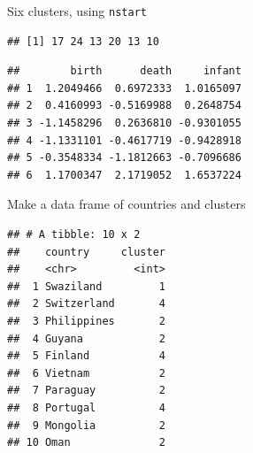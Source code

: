 \documentclass[ignorenonframetext,]{beamer}
\newenvironment{Shaded}{\begin{snugshade}}{\end{snugshade}}
\newcommand{\DataTypeTok}[1]{\textcolor[rgb]{0.13,0.29,0.53}{#1}}
\newcommand{\DecValTok}[1]{\textcolor[rgb]{0.00,0.00,0.81}{#1}}
\newcommand{\FloatTok}[1]{\textcolor[rgb]{0.00,0.00,0.81}{#1}}
\newcommand{\KeywordTok}[1]{\textcolor[rgb]{0.13,0.29,0.53}{\textbf{#1}}}
\newcommand{\NormalTok}[1]{#1}
\newcommand{\OperatorTok}[1]{\textcolor[rgb]{0.81,0.36,0.00}{\textbf{#1}}}
\newcommand{\StringTok}[1]{\textcolor[rgb]{0.31,0.60,0.02}{#1}}
\begin{document}
\begin{frame}[fragile]{Six clusters, using \texttt{nstart}}
\protect\hypertarget{six-clusters-using-nstart}{}

\begin{Shaded}
\end{Shaded}

\begin{verbatim}
## [1] 17 24 13 20 13 10
\end{verbatim}

\begin{Shaded}
\end{Shaded}

\begin{verbatim}
##        birth      death     infant
## 1  1.2049466  0.6972333  1.0165097
## 2  0.4160993 -0.5169988  0.2648754
## 3 -1.1458296  0.2636810 -0.9301055
## 4 -1.1331101 -0.4617719 -0.9428918
## 5 -0.3548334 -1.1812663 -0.7096686
## 6  1.1700347  2.1719052  1.6537224
\end{verbatim}

\end{frame}

\begin{frame}[fragile]{Make a data frame of countries and clusters}
\protect\hypertarget{make-a-data-frame-of-countries-and-clusters}{}

\begin{Shaded}
\end{Shaded}

\begin{verbatim}
## # A tibble: 10 x 2
##    country     cluster
##    <chr>         <int>
##  1 Swaziland         1
##  2 Switzerland       4
##  3 Philippines       2
##  4 Guyana            2
##  5 Finland           4
##  6 Vietnam           2
##  7 Paraguay          2
##  8 Portugal          4
##  9 Mongolia          2
## 10 Oman              2
\end{verbatim}

\end{frame}
\end{document}
